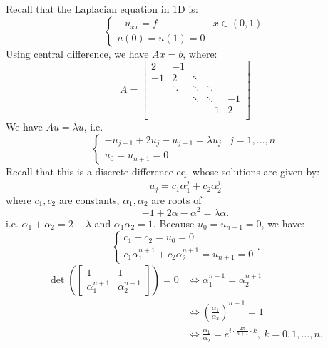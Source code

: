 \documentclass[../main/main.tex]{subfiles}
\begin{document}
  Recall that the Laplacian equation in 1D is: \[
\begin{cases}
  -u_{x x} = f& x \in(0,1)\\
  u(0)=u(1)=0
\end{cases}
\] Using central difference, we have $Ax = b$, where: \[
  A = \begin{bmatrix}
    2&-1&&&\\
    -1&2&\ddots&&\\
    &\ddots&\ddots&\ddots&\\
    &&\ddots&\ddots&-1\\
    &&&-1&2\\
  \end{bmatrix}
\]We have $Au = \lambda u$, i.e. \[
  \begin{cases}
  -u_{j-1}+2u_{j}-u_{j+1} =\lambda u_{j} & j=1 , \ldots , n\\
  u_{0}=u_{n+1}=0&
  \end{cases}
\]
Recall that this is a discrete difference eq. whose solutions are given by: \[
u_{j} = c_1 \alpha_{1}^{j} + c_2\alpha_{2}^{j}
\] where $c_1, c_2$ are constants, $\alpha_{1},\alpha_{2}$ are roots of \[-1 +2\alpha -\alpha^2=\lambda \alpha.\] i.e. $\alpha_{1}+\alpha_{2}=2-\lambda$ and $\alpha_{1}\alpha_{2}=1$. Because $u_{0}=u_{n+1}=0$, we have: \[
\begin{cases}
  c_1+c_2 = u_{0}=0\\
  c_1\alpha_{1}^{n+1} + c_2\alpha_{2}^{n+1}= u_{n+1}=0
\end{cases}.\]
\begin{align*}
  \det\left(\begin{bmatrix}
      1&1\\
      \alpha_{1}^{n+1}& \alpha_{2}^{n+1}
    \end{bmatrix}\right)=0 &\iff \alpha_{1}^{n+1} = \alpha_{2}^{n+1}\\
       &\iff \left(\frac{\alpha_{1}}{\alpha_{2}} \right)^{n+1}=1\\
       &\iff \frac{\alpha_{1}}{\alpha_{2}} = e^{i \cdot \frac{2\pi}{n+1}\cdot k },~ k=0,1, \ldots, n
  .\end{align*}
\end{document}
